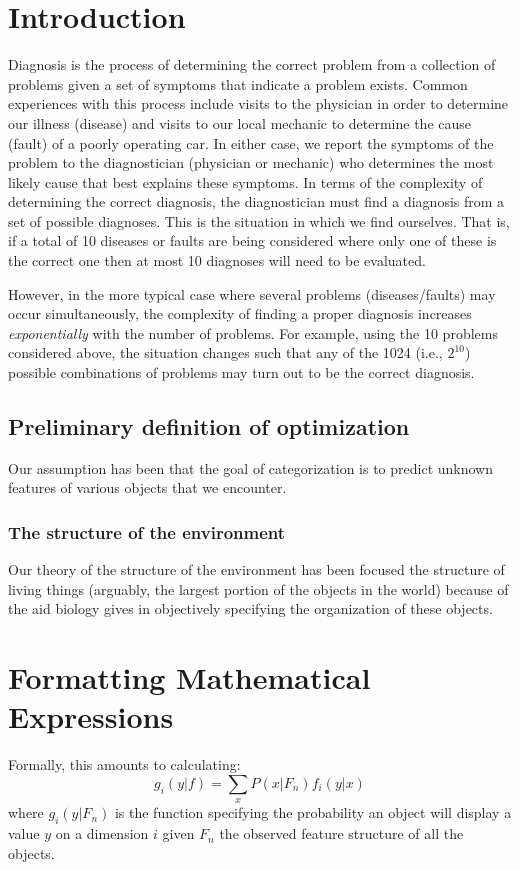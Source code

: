 \begin{article}

\section{Introduction}
Diagnosis is the process of determining the correct problem from a
collection of problems given a set of symptoms that indicate a
problem exists.  Common experiences with this process include visits
to the physician in order to determine our illness (disease) and
visits to our local mechanic to determine the cause (fault) of a
poorly operating car.  In either case, we report the symptoms of the
problem to the diagnostician (physician or mechanic) who determines
the most likely cause that best explains these symptoms.  In terms of
the complexity of determining the correct diagnosis, the
diagnostician must find a diagnosis from a set of possible diagnoses.
This is the situation in which we find ourselves.
That is, if a total of 10 diseases or faults are being considered
where only one of these is the correct one then at most 10 diagnoses
will need to be evaluated.


However, in the more typical case where several problems
(diseases/faults) may occur simultaneously, the complexity of finding
a proper diagnosis increases {\it exponentially} with the number of
problems. 
 For example, using the 10 problems considered above, the
 situation changes such that any of the 1024 (i.e., $2^{10}$) possible
 combinations of problems may turn out to be the correct diagnosis.



\subsection{Preliminary definition of optimization}
Our assumption has been that the goal of categorization is to predict
unknown features of various objects that we encounter.

\subsubsection{The structure of the environment}
Our theory of the structure of the environment has been focused the
structure of living things (arguably, the largest portion of the
objects in the world) because of the aid biology gives in objectively
specifying the organization of these objects.


\section{Formatting Mathematical Expressions}
Formally, this amounts to calculating:
\begin{equation}
g_i(y|f)=\sum_x P(x|F_n)f_i(y|x)
\end{equation}
where $g_i(y|F_n)$ is the function specifying the probability an object will
display a value $y$ on a dimension $i$ given $F_n$ the observed feature
structure of all the objects.



\end{article}
